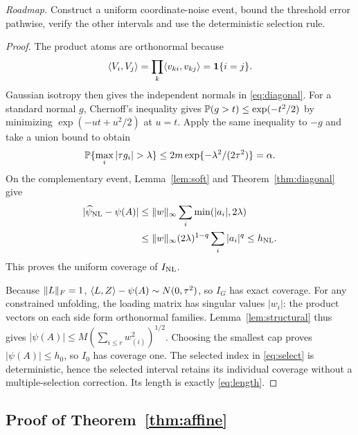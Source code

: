 \noindent\emph{Roadmap.} Construct a uniform coordinate-noise event, bound the threshold error pathwise, verify the other intervals and use the deterministic selection rule.
\begin{proof}
The product atoms are orthonormal because
\[
 \langle V_i,V_j\rangle=\prod_k\langle v_{ki},v_{kj}\rangle=\mathbf1\{i=j\}.
\]
Gaussian isotropy then gives the independent normals in \eqref{eq:diagonal}. For a standard normal $g$, Chernoff's inequality gives $\mathbb P(g>t)\le\exp(-t^2/2)$ by minimizing $\exp(-ut+u^2/2)$ at $u=t$. Apply the same inequality to $-g$ and take a union bound to obtain
\[
 \PP\{\max_i|\tau g_i|>\lambda\}
 \le2m\exp\{-\lambda^2/(2\tau^2)\}=\alpha.
\]
On the complementary event, Lemma~\ref{lem:soft} and Theorem~\ref{thm:diagonal} give
\begin{align*}
 |\widehat\psi_{\mathrm{NL}}-\psi(A)|
 &\le\lVert w\rVert_\infty\sum_i\min(|a_i|,2\lambda)\\
 &\le\lVert w\rVert_\infty(2\lambda)^{1-q}\sum_i|a_i|^q\le h_{\mathrm{NL}}.
\end{align*}
This proves the uniform coverage of $I_{\mathrm{NL}}$.

Because $\lVert L\rVert_F=1$, $\langle L,Z\rangle-\psi(A)\sim N(0,\tau^2)$, so $I_G$ has exact coverage. For any constrained unfolding, the loading matrix has singular values $|w_i|$: the product vectors on each side form orthonormal families. Lemma~\ref{lem:structural} thus gives $|\psi(A)|\le M(\sum_{i\le r}w_{(i)}^2)^{1/2}$. Choosing the smallest cap proves $|\psi(A)|\le h_0$, so $I_0$ has coverage one. The selected index in \eqref{eq:select} is deterministic, hence the selected interval retains its individual coverage without a multiple-selection correction. Its length is exactly \eqref{eq:length}.
\end{proof}

\subsection{Proof of Theorem~\ref{thm:affine}}



